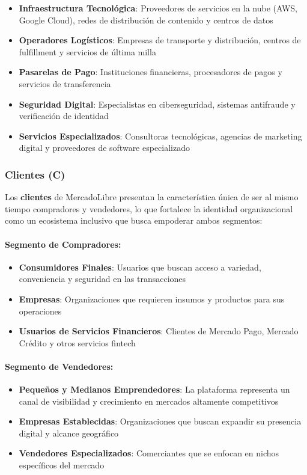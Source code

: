\begin{itemize}
\item \textbf{Infraestructura Tecnológica}: Proveedores de servicios en la nube (AWS, Google Cloud), redes de distribución de contenido y centros de datos
\item \textbf{Operadores Logísticos}: Empresas de transporte y distribución, centros de fulfillment y servicios de última milla
\item \textbf{Pasarelas de Pago}: Instituciones financieras, procesadores de pagos y servicios de transferencia
\item \textbf{Seguridad Digital}: Especialistas en ciberseguridad, sistemas antifraude y verificación de identidad
\item \textbf{Servicios Especializados}: Consultoras tecnológicas, agencias de marketing digital y proveedores de software especializado
\end{itemize}

\subsubsection{Clientes (C)}

Los \textbf{clientes} de MercadoLibre presentan la característica única de ser al mismo tiempo compradores y vendedores, lo que fortalece la identidad organizacional como un ecosistema inclusivo que busca empoderar ambos segmentos:

\paragraph{Segmento de Compradores:}
\begin{itemize}
\item \textbf{Consumidores Finales}: Usuarios que buscan acceso a variedad, conveniencia y seguridad en las transacciones
\item \textbf{Empresas}: Organizaciones que requieren insumos y productos para sus operaciones
\item \textbf{Usuarios de Servicios Financieros}: Clientes de Mercado Pago, Mercado Crédito y otros servicios fintech
\end{itemize}

\paragraph{Segmento de Vendedores:}
\begin{itemize}
\item \textbf{Pequeños y Medianos Emprendedores}: La plataforma representa un canal de visibilidad y crecimiento en mercados altamente competitivos
\item \textbf{Empresas Establecidas}: Organizaciones que buscan expandir su presencia digital y alcance geográfico
\item \textbf{Vendedores Especializados}: Comerciantes que se enfocan en nichos específicos del mercado
\end{itemize}

